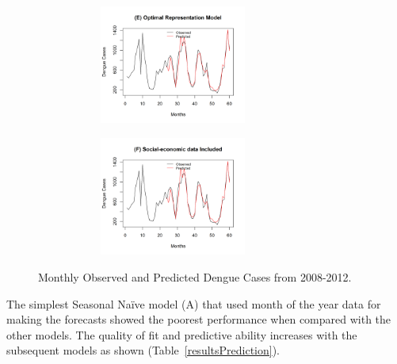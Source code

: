 \documentclass{bmcart}
\begin{document}
\begin{figure}[htbp]
\begin{minipage}[c]{1.0\textwidth}
		\label{fig:test3} \par\vfill
		\includegraphics[width=9cm,height=3.9cm]{Pred-OptimalRepresentation}
		\label{fig:test4} \par\vfill
		\includegraphics[width=9cm,height=3.9cm]{Pred-SocialIncluded}
		\label{fig:test5}
	\end{minipage}
	\caption{Monthly Observed and Predicted Dengue Cases from 2008-2012.}
	\label{fig:lolo}
\end{figure}




The simplest Seasonal Na\"{i}ve model (A) that used month of the year data for making the forecasts showed the poorest performance when compared with the other models. The quality of fit and predictive ability increases with the subsequent models as shown (Table~\ref{resultsPrediction}). 
\end{document}
